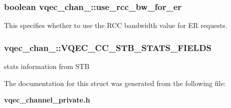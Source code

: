 \subsubsection{\setlength{\rightskip}{0pt plus 5cm}boolean \bf{vqec\_\-chan\_\-::use\_\-rcc\_\-bw\_\-for\_\-er}}\label{structvqec__chan___bbdbd4c512de724952f9f6f38888bfbd}


This specifies whether to use the RCC bandwidth value for ER requests. 
\subsubsection{\setlength{\rightskip}{0pt plus 5cm}\bf{vqec\_\-chan\_\-::VQEC\_\-CC\_\-STB\_\-STATS\_\-FIELDS}}\label{structvqec__chan___f49e124c68096ebc58889177026eab34}


stats information from STB 

The documentation for this struct was generated from the following file:\begin{CompactItemize}
\item 
\bf{vqec\_\-channel\_\-private.h}\end{CompactItemize}
